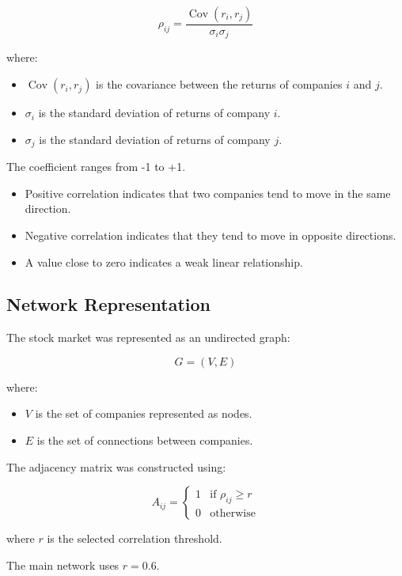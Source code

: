 \documentclass[11pt,a4paper]{article}
\begin{document}
\[
\rho_{ij} =
\frac{\operatorname{Cov}(r_i,r_j)}
{\sigma_i\sigma_j}
\]

where:

\begin{itemize}
    \item $\operatorname{Cov}(r_i,r_j)$ is the covariance
    between the returns of companies $i$ and $j$.
    \item $\sigma_i$ is the standard deviation of returns
    of company $i$.
    \item $\sigma_j$ is the standard deviation of returns
    of company $j$.
\end{itemize}

The coefficient ranges from -1 to +1.

\begin{itemize}
    \item Positive correlation indicates that two companies
    tend to move in the same direction.
    \item Negative correlation indicates that they tend
    to move in opposite directions.
    \item A value close to zero indicates a weak linear
    relationship.
\end{itemize}

\subsection{Network Representation}

The stock market was represented as an undirected graph:

\[
G=(V,E)
\]

where:

\begin{itemize}
    \item $V$ is the set of companies represented as nodes.
    \item $E$ is the set of connections between companies.
\end{itemize}

The adjacency matrix was constructed using:

\[
A_{ij} =
\begin{cases}
1 & \text{if } \rho_{ij}\geq r\\
0 & \text{otherwise}
\end{cases}
\]

where $r$ is the selected correlation threshold.

The main network uses $r=0.6$.
\end{document}
